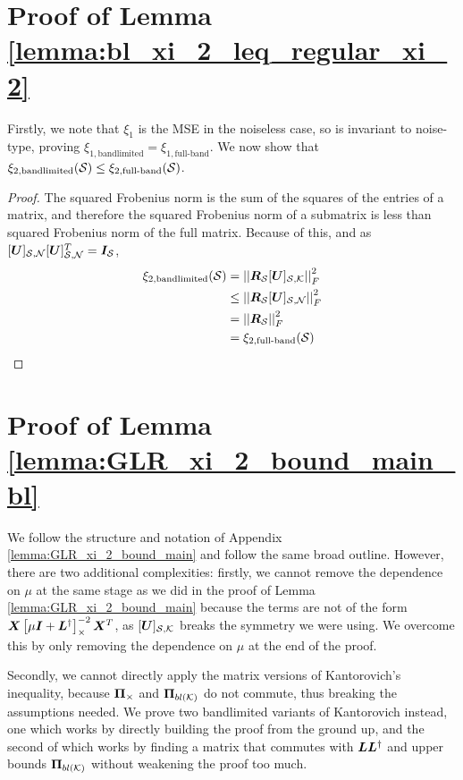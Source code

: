 \section{Proof of Lemma \ref{lemma:bl_xi_2_leq_regular_xi_2}}
\label{app:GLR_bandlimited_lemma}
Firstly, we note that $\xi_{1}$ is the MSE in the noiseless case, so is invariant to noise-type, proving $\xi_{1, \textrm{bandlimited}} = \xi_{1,\textrm{full-band}}$.
We now show that $\xi_{2, \textrm{bandlimited}}(\mathcal{S}) \leq \xi_{2,\textrm{full-band}}(\mathcal{S})$.
\begin{proof}
    The squared Frobenius norm is the sum of the squares of the entries of a matrix, and therefore the squared Frobenius norm of a submatrix is less than squared Frobenius norm of the full matrix. Because of this, and as $\matrsub[S,N]{U}\matrsub[S,N]{U}^{T} = \matr{I}_{\set{S}}$,
    \begin{align}
       \xi_{2, \textrm{bandlimited}}(\set{S}) &= \sqfrob{\matr{R}_{\set{S}}\matrsubU{S}} \\
       &\leq \sqfrob{\matr{R}_{\set{S}}\matrsub[S,N]{U}} \\
       &= \sqfrob{\matr{R}_{\set{S}}} \\
       &= \xi_{2, \textrm{full-band}}(\set{S})
   \end{align}
\end{proof}
\fi

\section{Proof of Lemma \ref{lemma:GLR_xi_2_bound_main_bl}}
\label{app:GLR_bandlimited_lemma_proof}
We follow the structure and notation of Appendix \ref{lemma:GLR_xi_2_bound_main} and follow the same broad outline. However, there are two additional complexities: firstly, we cannot remove the dependence on $\mu$ at the same stage as we did in the proof of Lemma \ref{lemma:GLR_xi_2_bound_main} because the terms are not of the form $\matr{X}\msub[\Theta]{\mu\matr{I} + \matr{L}^{\dagger}}^{-2}\matr{X}^{T}$, as $\matrsubU{S}$ breaks the symmetry we were using. We overcome this by only removing the dependence on $\mu$ at the end of the proof.

Secondly, we cannot directly apply the matrix versions of Kantorovich's inequality, because $\proj{\Theta}$ and $\projbl$ do not commute, thus breaking the assumptions needed. We prove two bandlimited variants of Kantorovich instead, one which works by directly building the proof from the ground up, and the second of which works by finding a matrix that commutes with $\bm{L}\bm{L}^{\dagger}$ and upper bounds $\projbl$ without weakening the proof too much.

